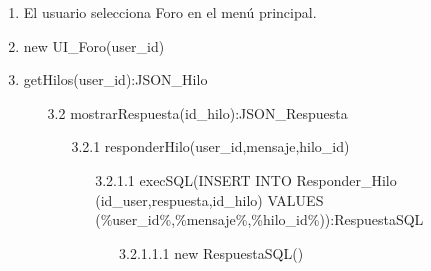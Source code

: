 ﻿\documentclass{report}
\begin{document}
            \begin{enumerate}
                \item El usuario selecciona Foro en el menú principal.
                \item new UI\_Foro(user\_id)
                \item getHilos(user\_id):JSON\_Hilo
                \begin{enumerate}
                    \item [3.2] mostrarRespuesta(id\_hilo):JSON\_Respuesta
                    \begin{enumerate}
                        \item [3.2.1] responderHilo(user\_id,mensaje,hilo\_id)
                        \begin{enumerate}
                            \item[3.2.1.1] execSQL(INSERT INTO Responder\_Hilo (id\_user,respuesta,id\_hilo) VALUES (\%user\_id\%,\%mensaje\%,\%hilo\_id\%)):RespuestaSQL
                            \begin{enumerate}
                                \item [3.2.1.1.1]new RespuestaSQL()
                            \end{enumerate}
                    \end{enumerate}
                \end{enumerate}
            \end{enumerate}
            \clearpage

\end{enumerate}
\end{document}
